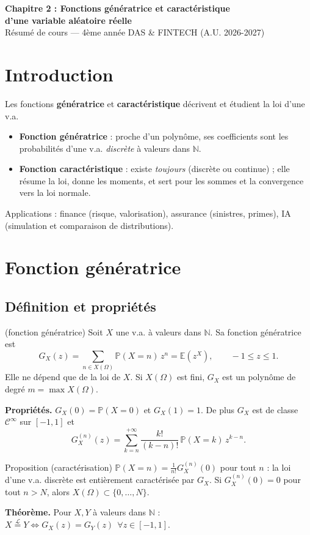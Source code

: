 \documentclass[11pt,a4paper]{article}
\newcommand{\E}{\mathbb{E}}
\renewcommand{\P}{\mathbb{P}}
\newcommand{\N}{\mathbb{N}}
\newcommand{\loi}{\overset{\mathcal L}{=}}
\begin{document}
\begin{center}
{\LARGE\bfseries Chapitre 2 : Fonctions génératrice et caractéristique\\[2pt] d'une variable aléatoire réelle}\\[6pt]
{\large Résumé de cours --- 4ème année DAS \& FINTECH (A.U. 2026-2027)}
\end{center}
\vspace{2pt}
\tableofcontents
\vspace{4pt}

\section{Introduction}
Les fonctions \textbf{génératrice} et \textbf{caractéristique} décrivent et étudient la loi d'une v.a.
\begin{itemize}
\item \textbf{Fonction génératrice} : proche d'un polynôme, ses coefficients sont les probabilités d'une v.a. \emph{discrète} à valeurs dans $\N$.
\item \textbf{Fonction caractéristique} : existe \emph{toujours} (discrète ou continue) ; elle résume la loi, donne les moments, et sert pour les sommes et la convergence vers la loi normale.
\end{itemize}
Applications : finance (risque, valorisation), assurance (sinistres, primes), IA (simulation et comparaison de distributions).

\section{Fonction génératrice}
\subsection{Définition et propriétés}
\begin{defn}{(fonction génératrice)}
Soit $X$ une v.a. à valeurs dans $\N$. Sa fonction génératrice est
\[ G_X(z)=\sum_{n\in X(\Omega)}\P(X=n)\,z^n=\E(z^X),\qquad -1\le z\le 1. \]
Elle ne dépend que de la loi de $X$. Si $X(\Omega)$ est fini, $G_X$ est un polynôme de degré $m=\max X(\Omega)$.
\end{defn}

\textbf{Propriétés.} $G_X(0)=\P(X=0)$ et $G_X(1)=1$. De plus $G_X$ est de classe $\mathcal C^\infty$ sur $[-1,1]$ et
\[ G_X^{(n)}(z)=\sum_{k=n}^{+\infty}\frac{k!}{(k-n)!}\,\P(X=k)\,z^{k-n}. \]

\begin{thm}{Proposition (caractérisation)}
$\displaystyle \P(X=n)=\frac{1}{n!}G_X^{(n)}(0)$ pour tout $n$ : la loi d'une v.a. discrète est entièrement caractérisée par $G_X$. Si $G_X^{(n)}(0)=0$ pour tout $n>N$, alors $X(\Omega)\subset\{0,\dots,N\}$.

\smallskip
\textbf{Théorème.} Pour $X,Y$ à valeurs dans $\N$ : $X\loi Y\iff G_X(z)=G_Y(z)\ \ \forall z\in[-1,1]$.
\end{thm}
\end{document}
